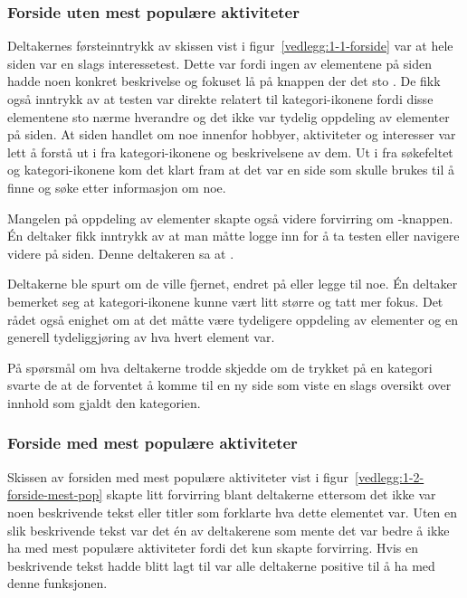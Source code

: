 \subsubsection{Forside uten mest populære aktiviteter}
\label{section:test-forside-1.0}
Deltakernes førsteinntrykk av skissen vist i figur~\ref{vedlegg:1-1-forside} var at hele siden var en slags interessetest. Dette var fordi ingen av elementene på siden hadde noen konkret beskrivelse og fokuset lå på knappen der det sto . De fikk også inntrykk av at testen var direkte relatert til kategori-ikonene fordi disse elementene sto nærme hverandre og det ikke var tydelig oppdeling av elementer på siden. At siden handlet om noe innenfor hobbyer, aktiviteter og interesser var lett å forstå ut i fra kategori-ikonene og beskrivelsene av dem. Ut i fra søkefeltet og kategori-ikonene kom det klart fram at det var en side som skulle brukes til å finne og søke etter informasjon om noe. 

Mangelen på oppdeling av elementer skapte også videre forvirring om -knappen. Én deltaker fikk inntrykk av at man måtte logge inn for å ta testen eller navigere videre på siden. Denne deltakeren sa at .

Deltakerne ble spurt om de ville fjernet, endret på eller legge til noe. Én deltaker bemerket seg at kategori-ikonene kunne vært litt større og tatt mer fokus. Det rådet også enighet om at det måtte være tydeligere oppdeling av elementer og en generell tydeliggjøring av hva hvert element var.

På spørsmål om hva deltakerne trodde skjedde om de trykket på en kategori svarte de at de forventet å komme til en ny side som viste en slags oversikt over innhold som gjaldt den kategorien.

\subsubsection{Forside med mest populære aktiviteter}
Skissen av forsiden med mest populære aktiviteter vist i figur~\ref{vedlegg:1-2-forside-mest-pop} skapte litt forvirring blant deltakerne ettersom det ikke var noen beskrivende tekst eller titler som forklarte hva dette elementet var. Uten en slik beskrivende tekst var det én av deltakerene som mente det var bedre å ikke ha med mest populære aktiviteter fordi det kun skapte forvirring. Hvis en beskrivende tekst hadde blitt lagt til var alle deltakerne positive til å ha med denne funksjonen. 

